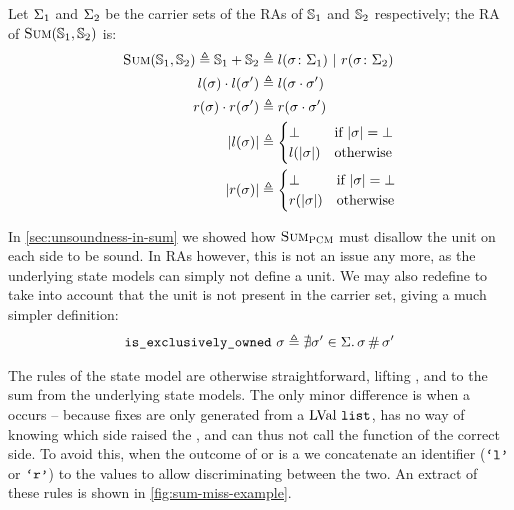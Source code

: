 Let $\Sigma_1$ and $\Sigma_2$ be the carrier sets of the RAs of $\mathbb S_1$ and $\mathbb S_2$ respectively; the RA of $\textsc{Sum}(\mathbb S_1,\mathbb S_2)$ is:
\begin{align*}
	\textsc{Sum}(\mathbb S_1, \mathbb S_2) \triangleq \mathbb S_1+\mathbb S_2 &\triangleq l(\sigma\colon \Sigma_1) ~|~ r(\sigma\colon \Sigma_2)\\
	l(\sigma)\cdot l(\sigma') &\triangleq l(\sigma\cdot \sigma')\\
	r(\sigma)\cdot r(\sigma') &\triangleq r(\sigma\cdot \sigma')\\
	|l(\sigma)|&\triangleq \begin{cases}
 		\bot &\text{if}~ |\sigma|=\bot\\
 		l(|\sigma|) &\text{otherwise}
	 \end{cases}\\
	 |r(\sigma)|&\triangleq \begin{cases}
 		\bot &\text{if}~ |\sigma|=\bot\\
 		r(|\sigma|) &\text{otherwise}
	 \end{cases}
\end{align*}

In \cref{sec:unsoundness-in-sum} we showed how $\textsc{Sum}_{\textsc{PCM}}$ must disallow the unit on each side to be sound. In RAs however, this is not an issue any more, as the underlying state models can simply not define a unit. We may also redefine \isexowned{} to take into account that the unit is not present in the carrier set, giving a much simpler definition: \begin{align*}
	\texttt{is\_exclusively\_owned}~\sigma \triangleq \nexists \sigma'\in\Sigma\ldotp \sigma\operatorname{\#}\sigma'
\end{align*}

The rules of the \Sum{} state model are otherwise straightforward, lifting \execac, \consume{} and \produce{} to the sum from the underlying state models. The only minor difference is when a \Miss{} occurs -- because fixes are only generated from a $\text{LVal}~\texttt{list}$, \Sum{} has no way of knowing which side raised the \Miss, and can thus not call the \fix{} function of the correct side. To avoid this, when the outcome of \execac{} or \consume{} is a \Miss{} we concatenate an identifier ($\texttt{`l'}$ or $\texttt{`r'}$) to the values to allow discriminating between the two. An extract of these rules is shown in \autoref{fig:sum-miss-example}.

